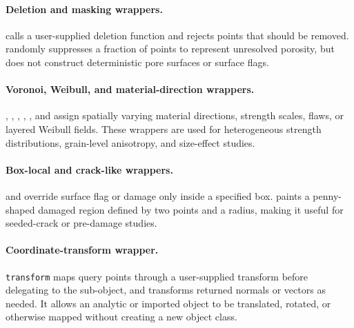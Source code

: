 \paragraph{Deletion and masking wrappers.} calls a user-supplied deletion function and rejects points that should be removed.   randomly suppresses a fraction of points to represent unresolved porosity, but does not construct deterministic pore surfaces or surface flags.

\paragraph{Voronoi, Weibull, and material-direction wrappers.}, , , , , and  assign spatially varying material directions, strength scales, flaws, or layered Weibull fields.  These wrappers are used for heterogeneous strength distributions, grain-level anisotropy, and size-effect studies.

\paragraph{Box-local and crack-like wrappers.} and  override surface flag or damage only inside a specified box.   paints a penny-shaped damaged region defined by two points and a radius, making it useful for seeded-crack or pre-damage studies.

\paragraph{Coordinate-transform wrapper.}\texttt{transform} maps query points through a user-supplied transform before delegating to the sub-object, and transforms returned normals or vectors as needed.  It allows an analytic or imported object to be translated, rotated, or otherwise mapped without creating a new object class.
